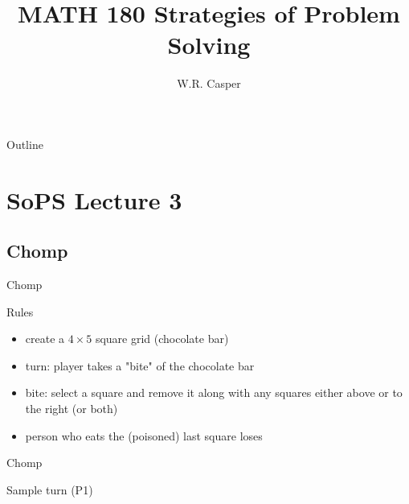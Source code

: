 \documentclass{beamer}
\title{MATH 180 Strategies of Problem Solving}
\subtitle
{} %
\author[W.R. Casper] %
{W.R. Casper}
\institute[California State University Fullerton] %
{
  Department of Mathematics\\
  California State University Fullerton}
\begin{document}
\begin{frame}
  \titlepage
\end{frame}

\begin{frame}{Outline}
  \tableofcontents
\end{frame}



\section{SoPS Lecture 3}
\subsection{Chomp}

\begin{frame}{Chomp}
  \begin{block}{Rules}
    \begin{itemize}
      \item create a $4\times 5$ square grid (chocolate bar)
    \end{itemize}
    \begin{center}
    \end{center}
    \begin{itemize}
      \item turn: player takes a "bite" of the chocolate bar 
      \item bite: select a square and remove it along with any squares either above or to the right (or both)
      \item person who eats the (poisoned) last square loses
    \end{itemize}
  \end{block}
\end{frame}

\begin{frame}{Chomp}
  \begin{block}{Sample turn (P1)}
    \begin{center}
    \end{center}
  \end{block}
\end{frame}
\end{document}
